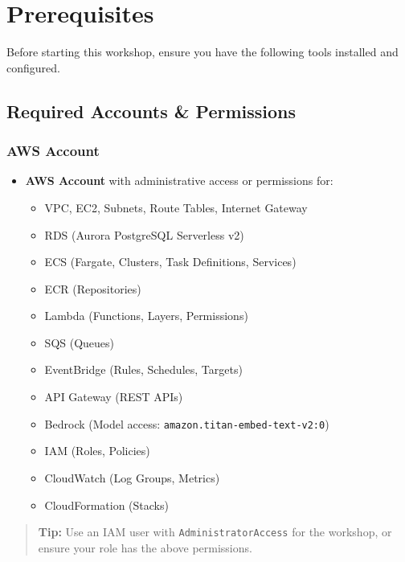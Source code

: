 \hypertarget{prerequisites}{%
\section{Prerequisites}}

Before starting this workshop, ensure you have the following tools
installed and configured.

\hypertarget{required-accounts-permissions}{%
\subsection{Required Accounts \&
Permissions}}

\hypertarget{aws-account}{%
\subsubsection{AWS Account}}

\begin{itemize}
\tightlist
\item
  \textbf{AWS Account} with administrative access or permissions for:

  \begin{itemize}
  \tightlist
  \item
    VPC, EC2, Subnets, Route Tables, Internet Gateway
  \item
    RDS (Aurora PostgreSQL Serverless v2)
  \item
    ECS (Fargate, Clusters, Task Definitions, Services)
  \item
    ECR (Repositories)
  \item
    Lambda (Functions, Layers, Permissions)
  \item
    SQS (Queues)
  \item
    EventBridge (Rules, Schedules, Targets)
  \item
    API Gateway (REST APIs)
  \item
    Bedrock (Model access: \texttt{amazon.titan-embed-text-v2:0})
  \item
    IAM (Roles, Policies)
  \item
    CloudWatch (Log Groups, Metrics)
  \item
    CloudFormation (Stacks)
  \end{itemize}
\end{itemize}

\begin{quote}
\textbf{Tip:} Use an IAM user with \texttt{AdministratorAccess} for the
workshop, or ensure your role has the above permissions.
\end{quote}

